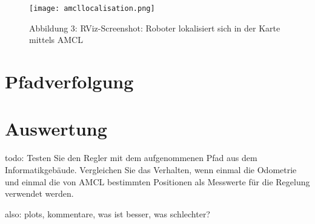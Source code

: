 \documentclass[11pt,a4paper]{article}
\begin{document}
\begin{figure}[H]
  \caption*{Abbildung 3: RViz-Screenshot: Roboter lokalisiert sich in der Karte mittels AMCL}
  \texttt{[image: amcllocalisation.png]}
  \centering
\end{figure}

\section{Pfadverfolgung}


\section{Auswertung}
todo: 
Testen Sie den Regler mit dem aufgenommenen Pfad aus dem Informatikgebäude. Vergleichen Sie das Verhalten, wenn einmal die Odometrie und einmal die von AMCL bestimmten
Positionen als Messwerte für die Regelung verwendet werden.

also: plots, kommentare, was ist besser, was schlechter?

\end{document}
